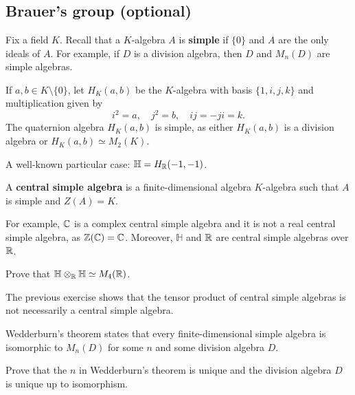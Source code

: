\section{}

\subsection{Brauer's group (optional)}

Fix a field $K$. Recall that a $K$-algebra $A$ is \textbf{simple} 
if $\{0\}$ and $A$ are the only ideals of $A$. 
For example, if $D$ is a division algebra, then $D$ and $M_n(D)$ are simple algebras. 

\begin{example}
    If $a,b\in K\setminus\{0\}$, let $H_K(a,b)$ be the $K$-algebra 
    with basis $\{1,i,j,k\}$ and multiplication given by
    \[
    i^2=a,\quad
    j^2=b,\quad 
    ij=-ji=k.
    \]
    The quaternion algebra $H_K(a,b)$ is simple, as either $H_K(a,b)$ is a division algebra
    or $H_K(a,b)\simeq M_2(K)$. 
\end{example}

A well-known particular case: $\mathbb{H}=H_{\mathbb{R}}(-1,-1)$. 

\begin{definition}
    A \textbf{central simple algebra} is a finite-dimensional algebra $K$-algebra
    such that $A$ is simple and $Z(A)=K$.
\end{definition}

For example, $\mathbb{C}$ is a complex central simple algebra and
it is not a real central simple algebra, as $\mathbb{Z}(\mathbb{C})=\mathbb{C}$. Moreover, 
$\mathbb{H}$ and $\mathbb{R}$ are central simple algebras over $\mathbb{R}$.  

\begin{exercise}
    Prove that $\mathbb{H}\otimes_{\mathbb{R}}\mathbb{H}\simeq M_4(\mathbb{R})$.  
\end{exercise}

The previous exercise shows that the tensor product of central simple algebras is not 
necessarily a central simple algebra. 

Wedderburn's theorem states that every finite-dimensional 
simple algebra is isomorphic to $M_n(D)$ 
for some $n$ and some division algebra $D$. 

\begin{exercise}
    Prove that the $n$ in Wedderburn's theorem is unique and
    the division algebra $D$ is unique up to isomorphism. 
\end{exercise}

